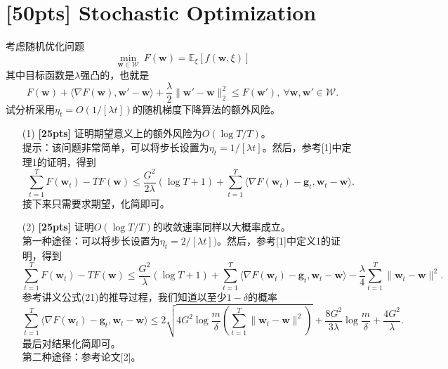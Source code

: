 \documentclass[a4paper,UTF8]{article}
\numberwithin{equation}{section}
\begin{document}
\newpage
\section{[50pts] Stochastic Optimization}
\noindent 考虑随机优化问题
\[
\min_{\mathbf{w} \in \mathcal{W}} \ F(\mathbf{w})= \mathbb{E}_{\xi} \left[ f(\mathbf{w}, \xi) \right]
\]
其中目标函数是$\lambda$强凸的，也就是
\begin{equation}\label{eqn:strong}
F(\mathbf{w}) + \langle \nabla F(\mathbf{w}), \mathbf{w}'-\mathbf{w}  \rangle + \frac{\lambda}{2} \|\mathbf{w}'-\mathbf{w}\|_2^2 \leq F(\mathbf{w}'), \ \forall \mathbf{w}, \mathbf{w}' \in \mathcal{W}.
\end{equation}
试分析采用$\eta_t=O(1/[\lambda t])$的随机梯度下降算法的额外风险。
\begin{enumerate}
  \item[(1)] \textbf{[25pts]} 证明期望意义上的额外风险为$O(\log T/T)$。\\
  提示：该问题非常简单，可以将步长设置为$\eta_t=1/[\lambda t]$。然后，参考[1]中定理1的证明，得到
\[
 \sum_{t=1}^T F(\mathbf{w}_{t}) - T F(\mathbf{w}) \leq \frac{G^2}{2 \lambda} (\log T+1) + \sum_{t=1}^T \langle \nabla F(\mathbf{w}_t)-\mathbf{g}_t, \mathbf{w}_t - \mathbf{w} \rangle.
\]
接下来只需要求期望，化简即可。
  \item[(2)] \textbf{[25pts]} 证明$O(\log T/T)$的收敛速率同样以大概率成立。\\
第一种途径：可以将步长设置为$\eta_t=2/[\lambda t])$。然后，参考[1]中定义1的证明，得到
\[
 \sum_{t=1}^T F(\mathbf{w}_{t}) - T F(\mathbf{w}) \leq    \frac{G^2}{\lambda}(\log T+1) +\sum_{t=1}^T \langle \nabla F(\mathbf{w}_t)-\mathbf{g}_t, \mathbf{w}_t - \mathbf{w} \rangle- \frac{\lambda}{4} \sum_{t=1}^T \|\mathbf{w}_t - \mathbf{w}\|^2.
\]
参考讲义公式(21)的推导过程，我们知道以至少$1-\delta$的概率
 \[
 \sum_{t=1}^T \langle \nabla F(\mathbf{w}_t)-\mathbf{g}_t, \mathbf{w}_t - \mathbf{w} \rangle \leq  2\sqrt{ 4 G^2  \log \frac{m }{\delta} \left( \sum_{t=1}^T \|\mathbf{w}_t - \mathbf{w}\|^2\right)} +  \frac{8G^2}{3\lambda}   \log \frac{m }{\delta} + \frac{4G^2}{\lambda} .
\]
最后对结果化简即可。\\
第二种途径：参考论文[2]。
\end{enumerate}
\end{document}
